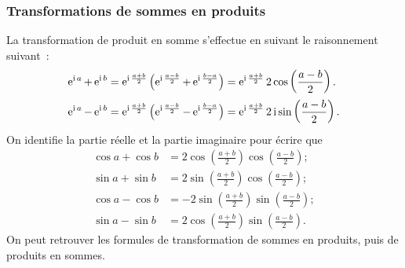 \subsubsection{Transformations de sommes en produits}
\label{subsubsec:sommeprod}
La transformation de produit en somme s'effectue en suivant le raisonnement 
suivant~:
\begin{align}
    \operatorname{e}^{\operatorname{i} a} + \operatorname{e}^{\operatorname{i} b} &= \operatorname{e}^{\operatorname{i} \frac{a + b}{2}} \left(\operatorname{e}^{\operatorname{i} \frac{a-b}{2}} 
    + \operatorname{e}^{\operatorname{i} \frac{b-a}{2}}\right)  =  \operatorname{e}^{\operatorname{i} \frac{a + b}{2}} 2\cos 
    \left(\frac{a-b}{2} \right).\\
    \operatorname{e}^{\operatorname{i} a}-\operatorname{e}^{\operatorname{i} b} &= \operatorname{e}^{\operatorname{i} \frac{a + b}{2}} \left( 
    \operatorname{e}^{\operatorname{i} \frac{a-b}{2}} - \operatorname{e}^{\operatorname{i} \frac{b-a}{2}} \right) =  
    \operatorname{e}^{\operatorname{i} \frac{a + b}{2}} 2 \operatorname{i} \sin \left( \frac{a-b}{2} \right).
\end{align}
On identifie la partie réelle et la partie imaginaire pour écrire que
\begin{align}
    \cos a + \cos b &= 2 \cos \left( \frac{a + b}{2} \right) \cos 
    \left(\frac{a-b}{2} \right);\\
    \sin a + \sin b &= 2 \sin \left( \frac{a + b}{2} \right) \cos 
    \left(\frac{a-b}{2} \right);\\
    \cos a - \cos b &= -2 \sin \left( \frac{a + b}{2} \right) \sin 
    \left(\frac{a-b}{2} \right);\\
    \sin a - \sin b &= 2 \cos \left( \frac{a + b}{2} \right) \sin 
    \left(\frac{a-b}{2} \right).
\end{align}
On peut retrouver les formules de transformation de sommes en produits, puis de 
produits en sommes.
